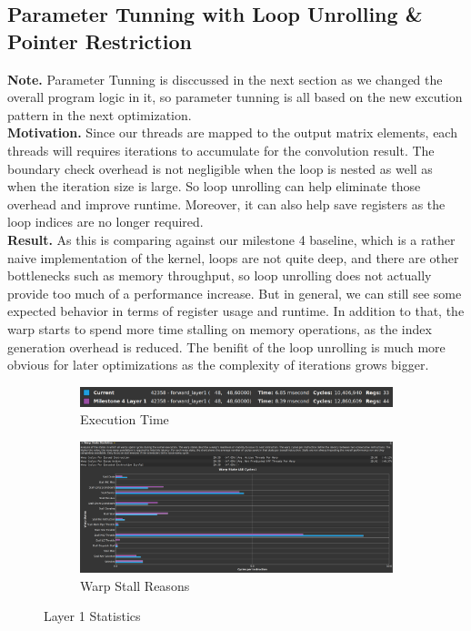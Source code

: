 \documentclass{article}
\begin{document}
\subsection{Parameter Tunning with Loop Unrolling \& Pointer Restriction}

\textbf{Note.} Parameter Tunning is disccussed in the next section as we changed
the overall program logic in it, so parameter tunning is all based on the new
excution pattern in the next optimization.\\

\textbf{Motivation.} Since our threads are mapped to the output matrix elements,
each threads will requires iterations to accumulate for the convolution result.
The boundary check overhead is not negligible when the loop is nested as well as
when the iteration size is large. So loop unrolling can help eliminate those overhead
and improve runtime. Moreover, it can also help save registers as the loop indices
are no longer required.\\

\textbf{Result.} As this is comparing against our milestone 4 baseline, which is
a rather naive implementation of the kernel, loops are not quite deep, and there
are other bottlenecks such as memory throughput, so loop unrolling does not actually
provide too much of a performance increase. But in general, we can still see some
expected behavior in terms of register usage and runtime. In addition to that,
the warp starts to spend more time stalling on memory operations, as the index generation
overhead is reduced. The benifit of the loop unrolling is
much more obvious for later optimizations as the complexity of iterations grows bigger.\\

\begin{figure}[H]
    \centering
    \begin{subfigure}[b]{\linewidth}
        \includegraphics[width=\linewidth]{pragma_layer1_summary}
        \caption{Execution Time}
    \end{subfigure}
    \begin{subfigure}[b]{\linewidth}
        \includegraphics[width=\linewidth]{pragma_layer1_warp}
        \caption{Warp Stall Reasons}
    \end{subfigure}
    \caption{Layer 1 Statistics}
\end{figure}
\end{document}
